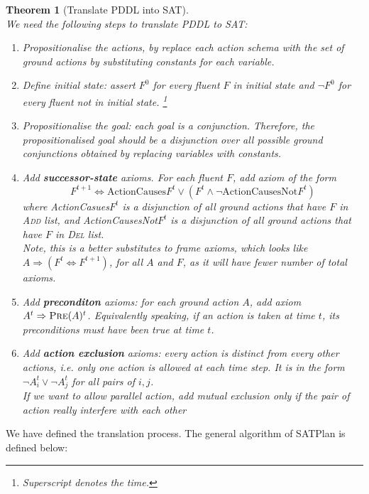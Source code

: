 \documentclass[12pt]{article}
\newtheorem{theorem}{Theorem}[section]
\theoremstyle{definition}
\begin{document}
\begin{theorem}[Translate PDDL into SAT]
\hfill\\\normalfont We need the following steps to translate PDDL to SAT:
\begin{enumerate}
\item Propositionalise the actions, by replace each action schema with the set of ground actions by substituting constants for each variable.
\item Define initial state: assert $F^0$ for every fluent $F$ in initial state and $\neg F^0$ for every fluent not in initial state. \footnote{Superscript denotes the time.}
\item Propositionalise the goal: each goal is a conjunction. Therefore, the propositionalised goal should be a disjunction over all possible ground conjunctions obtained by replacing variables with constants.
\item Add \textbf{successor-state} axioms. For each fluent $F$, add axiom of the form
\[
F^{t+1}\Leftrightarrow \text{ActionCauses} F^t \lor (F^t\land \neg \text{ActionCausesNot} F^t)
\]
where ActionCasues$F^t$ is a disjunction of all ground actions that have $F$ in \textsc{Add} list, and ActionCausesNot$F^t$ is a disjunction of all ground actions that have $F$ in \textsc{Del} list.\\
Note, this is a better substitutes to frame axioms, which looks like $A\Rightarrow (F^t\Leftrightarrow F^{t+1})$, for all $A$ and $F$, as it will have fewer number of total axioms.
\item Add \textbf{preconditon} axioms: for each ground action $A$, add axiom $A^t\Rightarrow \textsc{Pre}(A)^t$. Equivalently speaking, if an action is taken at time $t$, its preconditions must have been true at time $t$.
\item Add \textbf{action exclusion} axioms: every action is distinct from every other actions, i.e. only one action is allowed at each time step. It is in the form $\neg A_i^t\lor \neg A_j^t$ for all pairs of $i,j$.\\
If we want to allow parallel action, add mutual exclusion only if the pair of action really interfere with each other
\end{enumerate}
\end{theorem}
We have defined the translation process. The general algorithm of SATPlan is defined below:
\end{document}
